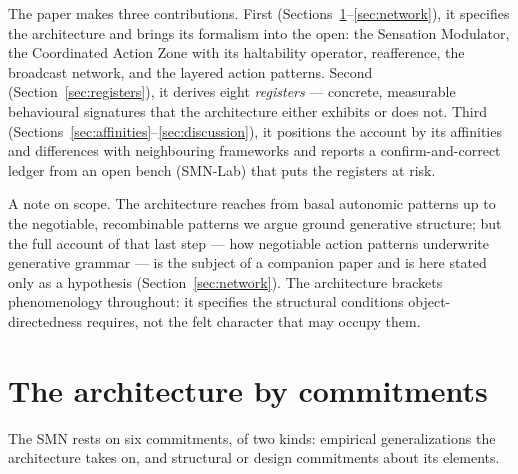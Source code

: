 \documentclass[utf8]{FrontiersinHarvard}
\begin{document}
The paper makes three contributions. First (Sections~\ref{sec:commitments}--\ref{sec:network}), it specifies the architecture and brings its formalism into the open: the Sensation Modulator, the Coordinated Action Zone with its haltability operator, reafference, the broadcast network, and the layered action patterns. Second (Section~\ref{sec:registers}), it derives eight \emph{registers} --- concrete, measurable behavioural signatures that the architecture either exhibits or does not. Third (Sections~\ref{sec:affinities}--\ref{sec:discussion}), it positions the account by its affinities and differences with neighbouring frameworks and reports a confirm-and-correct ledger from an open bench (SMN-Lab) that puts the registers at risk.

A note on scope. The architecture reaches from basal autonomic patterns up to the negotiable, recombinable patterns we argue ground generative structure; but the full account of that last step --- how negotiable action patterns underwrite generative grammar --- is the subject of a companion paper \citep{NagarjunaKarnamNAPprep} and is here stated only as a hypothesis (Section~\ref{sec:network}). The architecture brackets phenomenology throughout: it specifies the structural conditions object-directedness requires, not the felt character that may occupy them.

\section{The architecture by commitments}\label{sec:commitments}

The SMN rests on six commitments, of two kinds: empirical generalizations the architecture takes on, and structural or design commitments about its elements.
\end{document}
